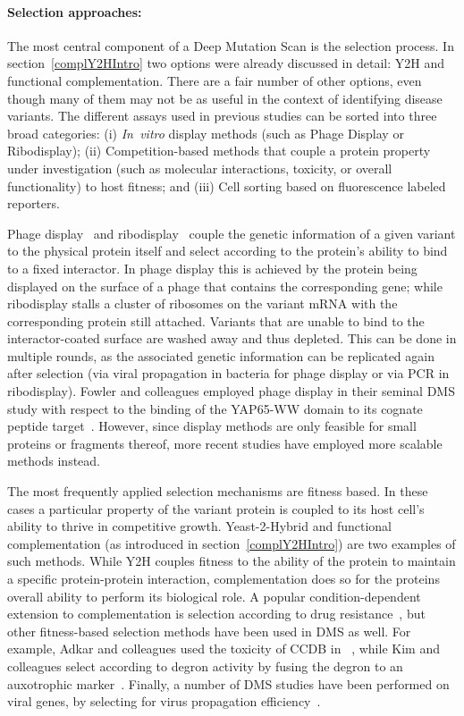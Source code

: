 \paragraph{Selection approaches:} The most central component of a Deep Mutation Scan is the selection process. In section~\ref{complY2HIntro} two options were already discussed in detail: Y2H and functional complementation. There are a fair number of other options, even though many of them may not be as useful in the context of identifying disease variants. The different assays used in previous studies can be sorted into three broad categories: (i) \textit{In~vitro} display methods (such as Phage Display or Ribodisplay); (ii) Competition-based methods that couple a protein property under investigation (such as molecular interactions, toxicity, or overall functionality) to host fitness; and (iii) Cell sorting based on fluorescence labeled reporters.

Phage display~\cite{smith_filamentous_1985} and ribodisplay~\cite{mattheakis_vitro_1994} couple the genetic information of a given variant to the physical protein itself and select according to the protein's ability to bind to a fixed interactor. In phage display this is achieved by the protein being displayed on the surface of a phage that contains the corresponding gene; while ribodisplay stalls a cluster of ribosomes on the variant mRNA with the corresponding protein still attached. Variants that are unable to bind to the interactor-coated surface are washed away and thus depleted. This can be done in multiple rounds, as the associated genetic information can be replicated again after selection (via viral propagation in bacteria for phage display or via PCR in ribodisplay). Fowler and colleagues employed phage display in their seminal DMS study with respect to the binding of the YAP65-WW domain to its cognate peptide target~\cite{fowler_high-resolution_2010}. However, since display methods are only feasible for small proteins or fragments thereof, more recent studies have employed more scalable methods instead.


The most frequently applied selection mechanisms are fitness based. In these cases a particular property of the variant protein is coupled to its host cell's ability to thrive in competitive growth. Yeast-2-Hybrid and functional complementation (as introduced in section~\ref{complY2HIntro}) are two examples of such methods. While Y2H couples fitness to the ability of the protein to maintain a specific protein-protein interaction, complementation does so for the proteins overall ability to perform its biological role. A popular condition-dependent extension to complementation is selection according to drug resistance~\cite{wu_systematic_2013,wagenaar_resistance_2014}, but other fitness-based selection methods have been used in DMS as well. For example, Adkar and colleagues used the toxicity of CCDB in ~\cite{adkar_protein_2012}, while Kim and colleagues select according to degron activity by fusing the degron to an auxotrophic marker~\cite{kim_high-throughput_2013}. Finally, a number of DMS studies have been performed on viral genes, by selecting for virus propagation efficiency~\cite{bloom_experimentally_2014,thyagarajan_inherent_2014}.

